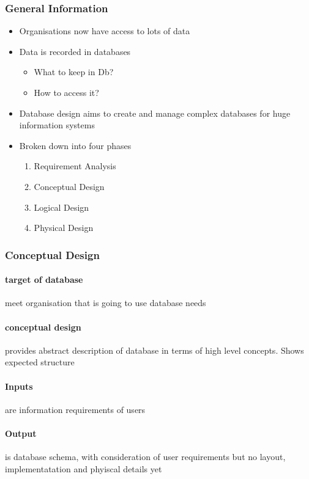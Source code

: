 \documentclass{article}
\begin{document}
		\subsubsection{General Information}
			\begin{itemize}
				\item Organisations now have access to lots of data
				\item Data is recorded in databases
					\begin{itemize}
						\item What to keep in Db?
						\item How to access it?
					\end{itemize}
				\item Database design aims to create and manage complex databases for huge information systems
				\item Broken down into four phases
					\begin{enumerate}
						\item Requirement Analysis
						\item Conceptual Design
						\item Logical Design
						\item Physical Design
					\end{enumerate}
			\end{itemize}

		\subsubsection{Conceptual Design}
			\paragraph{target of database} meet organisation that is going to use database needs
			\paragraph{conceptual design} provides abstract description of database in terms of high level concepts. Shows expected structure
			\paragraph{Inputs} are information requirements of users
			\paragraph{Output} is database schema, with consideration of user requirements but no layout, implementatation and phyiscal details yet
\end{document}
